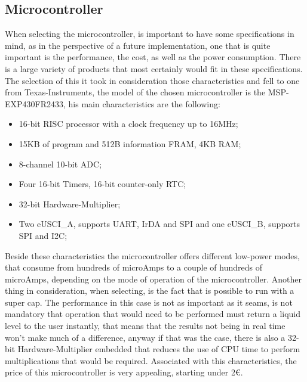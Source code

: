 \subsection{Microcontroller}
When selecting the microcontroller, is important to have some specifications in mind, as in the perspective of a future implementation, one that is quite important is the performance, the cost, as well as the power consumption. There is a large variety of products that most certainly would fit in these specifications. The selection of this it took in consideration those characteristics and fell to one from Texas-Instruments, the model of the chosen microcontroller is the MSP-EXP430FR2433, his main characteristics are the following:
\begin{itemize}
    \item 16-bit RISC processor with a clock frequency up to 16MHz;
    \item 15KB of program and 512B information FRAM, 4KB RAM;
    \item 8-channel 10-bit ADC;
    \item Four 16-bit Timers, 16-bit counter-only RTC;
    \item 32-bit Hardware-Multiplier;
    \item Two eUSCI\_A, supports UART, IrDA and SPI and one eUSCI\_B, supports SPI and I2C;
\end{itemize}
Beside these characteristics the microcontroller offers different low-power modes, that consume from hundreds of microAmps to a couple of hundreds of microAmps, depending on the mode of operation of the microcontroller. Another thing in consideration, when selecting, is the fact that is possible to run with a super cap. The performance in this case is not as important as it seams, is not mandatory that operation that would need to be performed must return a liquid level to the user instantly, that means that the results not being in real time won't make much of a difference, anyway if that was the case, there is also a 32-bit Hardware-Multiplier embedded that reduces the use of CPU time to perform multiplications that would be required\cite{MSP430FR2433DataSheet}. Associated with this characteristics, the price of this microcontroller is very appealing, starting under 2€.
